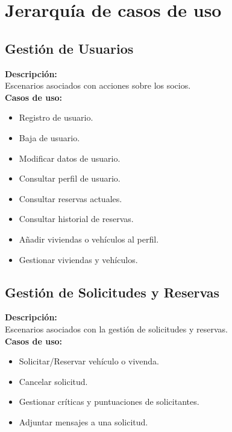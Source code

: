 \vspace{8mm}

\section{Jerarquía de casos de uso}
\subsection{Gestión de Usuarios}
\textbf{Descripción:}\\
Escenarios asociados con acciones sobre los socios.\\
\textbf{Casos de uso:}\\
	\begin{itemize}
		\item Registro de usuario.
		\item Baja de usuario.
		\item Modificar datos de usuario.
		\item Consultar perfil de usuario.
		\item Consultar reservas actuales.
		\item Consultar historial de reservas.
		\item Añadir viviendas o vehículos al perfil.
		\item Gestionar viviendas y vehículos.
	\end{itemize}
\subsection{Gestión de Solicitudes y Reservas}
\textbf{Descripción:}\\
Escenarios asociados con la gestión de solicitudes y reservas.\\
\textbf{Casos de uso:}\\
	\begin{itemize}
		\item Solicitar/Reservar vehículo o vivenda.
		\item Cancelar solicitud.
		\item Gestionar críticas y puntuaciones de solicitantes.
		\item Adjuntar mensajes a una solicitud.
	\end{itemize}
